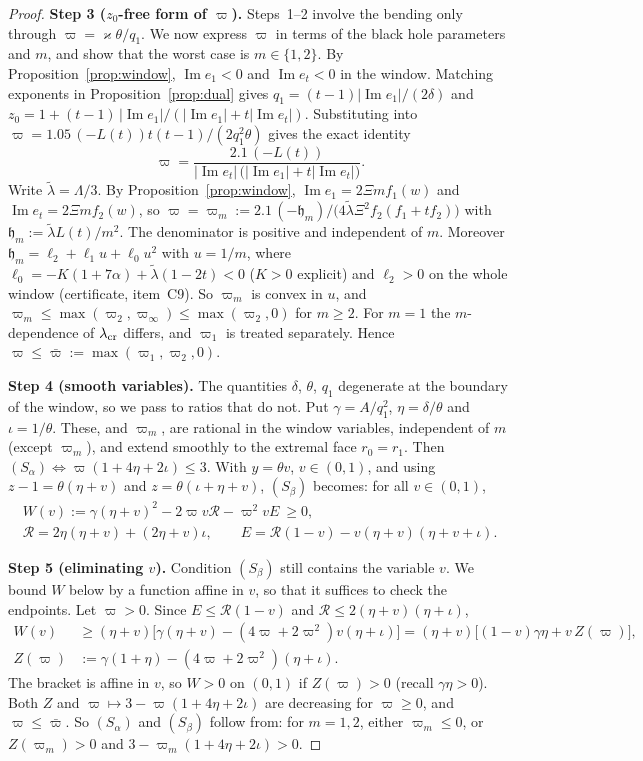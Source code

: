 \documentclass[11pt]{amsart}
\theoremstyle{definition}
\theoremstyle{remark}
\numberwithin{equation}{section}
\renewcommand{\Im}{\operatorname{Im}}
\begin{document}
\begin{proof}
\smallskip\noindent\textbf{Step 3 ($z_0$-free form of $\varpi$).} Steps~1--2 involve the bending only through
$\varpi=\varkappa\theta/q_1$. We now express $\varpi$ in terms of the black hole parameters and $m$, and show that
the worst case is $m\in\{1,2\}$. By Proposition~\ref{prop:window}, $\Im e_1<0$ and $\Im e_t<0$ in the window.
Matching exponents in Proposition~\ref{prop:dual} gives $q_1=(t-1)|\Im e_1|/(2\delta)$ and
$z_0=1+(t-1)\,|\Im e_1|/(|\Im e_1|+t|\Im e_t|)$. Substituting into $\varpi=1.05\,(-L(t))t(t-1)/(2q_1^2\theta)$ gives the
exact identity
\[
\varpi=\frac{2.1\,(-L(t))}{|\Im e_t|\,\big(|\Im e_1|+t|\Im e_t|\big)} .
\]
Write $\tilde\lambda=\Lambda/3$. By Proposition~\ref{prop:window}, $\Im e_1=2\Xi mf_1(w)$ and $\Im e_t=2\Xi mf_2(w)$, so
$\varpi=\varpi_m:=2.1\,(-\mathfrak h_m)/\big(4\tilde\lambda\Xi^2f_2(f_1+tf_2)\big)$ with $\mathfrak h_m:=\tilde\lambda L(t)/m^2$.
The denominator is positive and independent of $m$. Moreover $\mathfrak h_m=\ell_2+\ell_1u+\ell_0u^2$ with $u=1/m$, where
$\ell_0=-K(1+7\alpha)+\tilde\lambda(1-2t)<0$ ($K>0$ explicit) and $\ell_2>0$ on the whole window (certificate, item~C9).
So $\varpi_m$ is convex in $u$, and $\varpi_m\le\max(\varpi_2,\varpi_\infty)\le\max(\varpi_2,0)$ for $m\ge2$. For $m=1$ the
$m$-dependence of $\lambda_{\rm cr}$ differs, and $\varpi_1$ is treated separately. Hence $\varpi\le\bar\varpi:=\max(\varpi_1,\varpi_2,0)$.

\smallskip\noindent\textbf{Step 4 (smooth variables).} The quantities $\delta$, $\theta$, $q_1$ degenerate at the
boundary of the window, so we pass to ratios that do not. Put $\gamma=A/q_1^2$, $\eta=\delta/\theta$ and $\iota=1/\theta$. These, and $\varpi_m$, are
rational in the window variables, independent of $m$ (except $\varpi_m$), and extend smoothly to the extremal face
$r_0=r_1$. Then $(S_\alpha)\iff\varpi(1+4\eta+2\iota)\le3$. With $y=\theta v$, $v\in(0,1)$, and using
$z-1=\theta(\eta+v)$ and $z=\theta(\iota+\eta+v)$, $(S_\beta)$ becomes: for all $v\in(0,1)$,
\begin{gather*}
W(v):=\gamma(\eta+v)^2-2\varpi v\mathcal R-\varpi^2vE\ \ge0,\\
\mathcal R=2\eta(\eta+v)+(2\eta+v)\iota,\qquad E=\mathcal R(1-v)-v(\eta+v)(\eta+v+\iota).
\end{gather*}

\smallskip\noindent\textbf{Step 5 (eliminating $v$).} Condition $(S_\beta)$ still contains the variable $v$. We
bound $W$ below by a function affine in $v$, so that it suffices to check the endpoints. Let $\varpi>0$. Since $E\le \mathcal R(1-v)$ and $\mathcal R\le2(\eta+v)(\eta+\iota)$,
\begin{align*}
W(v)&\ge(\eta+v)\big[\gamma(\eta+v)-(4\varpi+2\varpi^2)v(\eta+\iota)\big]=(\eta+v)\big[(1-v)\gamma\eta+v\,Z(\varpi)\big],\\
Z(\varpi)&:=\gamma(1+\eta)-(4\varpi+2\varpi^2)(\eta+\iota).
\end{align*}
The bracket is affine in $v$, so $W>0$ on $(0,1)$ if $Z(\varpi)>0$ (recall $\gamma\eta>0$). Both $Z$ and
$\varpi\mapsto3-\varpi(1+4\eta+2\iota)$ are decreasing for $\varpi\ge0$, and $\varpi\le\bar\varpi$. So $(S_\alpha)$ and
$(S_\beta)$ follow from: for $m=1,2$, either $\varpi_m\le0$, or $Z(\varpi_m)>0$ and $3-\varpi_m(1+4\eta+2\iota)>0$.


\end{proof}
\end{document}
